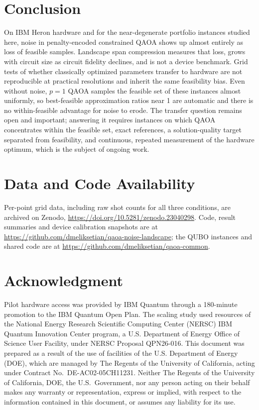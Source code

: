 \documentclass[conference]{IEEEtran}
\begin{document}
\section{Conclusion}
\label{sec:conclusion}

On IBM Heron hardware and for the near-degenerate portfolio instances
studied here, noise in penalty-encoded constrained QAOA shows up almost
entirely as loss of feasible samples. Landscape span compression
measures that loss, grows with circuit size as circuit fidelity
declines, and is not a device benchmark. Grid tests of
whether classically optimized parameters transfer to hardware are not
reproducible at practical resolutions and inherit the same feasibility
bias. Even without noise, $p{=}1$ QAOA samples the feasible set of
these instances almost uniformly, so best-feasible approximation ratios
near 1 are automatic and there is no within-feasible advantage for
noise to erode. The transfer question remains open and important;
answering it requires instances on which QAOA concentrates within the
feasible set, exact references, a solution-quality target separated
from feasibility, and continuous, repeated measurement of the hardware
optimum, which is the subject of ongoing work.

\section*{Data and Code Availability}

Per-point grid data, including raw shot counts for all three conditions, are
archived on Zenodo, \url{https://doi.org/10.5281/zenodo.23040298}. Code, result summaries and device calibration
snapshots are at \url{https://github.com/dmeliksetian/qaoa-noise-landscape}; the
QUBO instances and shared code are at
\url{https://github.com/dmeliksetian/qaoa-common}.

\section*{Acknowledgment}

Pilot hardware access was provided by IBM Quantum through a 180-minute
promotion to the IBM Quantum Open Plan. The scaling study used
resources of the National Energy Research Scientific Computing Center
(NERSC) IBM Quantum Innovation Center program, a U.S. Department of
Energy Office of Science User Facility, under NERSC Proposal QPN26-016.
This document was prepared as a result of the use of facilities of the
U.S. Department of Energy (DOE), which are managed by The Regents of the
University of California, acting under Contract No.\ DE-AC02-05CH11231.
Neither The Regents of the University of California, DOE, the U.S.\
Government, nor any person acting on their behalf makes any warranty or
representation, express or implied, with respect to the information
contained in this document, or assumes any liability for its use.
\end{document}
